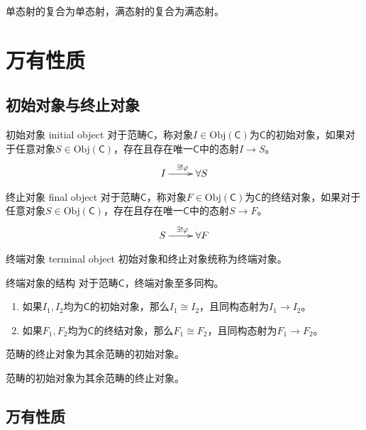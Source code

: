 \begin{proposition}
	单态射的复合为单态射，满态射的复合为满态射。
\end{proposition}

\section{万有性质}

\subsection{初始对象与终止对象}

\begin{definition}{初始对象 initial object}
	对于范畴$\mathsf{C}$，称对象$I\in\mathrm{Obj}(\mathsf{C})$为$\mathsf{C}$的初始对象，如果对于任意对象$S\in\mathrm{Obj}(\mathsf{C})$，存在且存在唯一$\mathsf{C}$中的态射$I\to S$。
	$$
	\xymatrix{
		I\ar[r]^{\exists!\varphi}&\forall S
	}
	$$
\end{definition}

\begin{definition}{终止对象 final object}
	对于范畴$\mathsf{C}$，称对象$F\in\mathrm{Obj}(\mathsf{C})$为$\mathsf{C}$的终结对象，如果对于任意对象$S\in\mathrm{Obj}(\mathsf{C})$，存在且存在唯一$\mathsf{C}$中的态射$S\to F$。
	$$
	\xymatrix{
		S\ar[r]^{\exists!\varphi}&\forall F
	}
	$$
\end{definition}

\begin{definition}{终端对象 terminal object}
	初始对象和终止对象统称为终端对象。
\end{definition}

\begin{proposition}{终端对象的结构}
	对于范畴$\mathsf{C}$，终端对象至多同构。
	\begin{enumerate}
		\item 如果$I_1,I_2$均为$\mathsf{C}$的初始对象，那么$I_1\cong I_2$，且同构态射为$I_1\to I_2$。
		\item 如果$F_1,F_2$均为$\mathsf{C}$的终结对象，那么$F_1\cong F_2$，且同构态射为$F_1\to F_2$。
	\end{enumerate}
\end{proposition}

\begin{proposition}
	范畴的终止对象为其余范畴的初始对象。
	
	范畴的初始对象为其余范畴的终止对象。
\end{proposition}

\subsection{万有性质}

